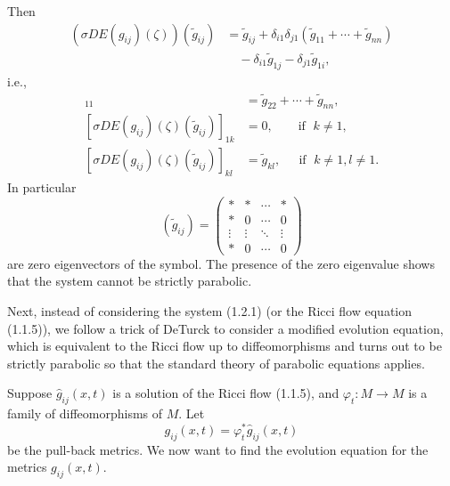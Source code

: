 Then
\begin{align*}
(\sigma DE(g_{ij})(\zeta))(\tilde{g}_{ij}) &  =
\tilde{g}_{ij}+\delta_{i1}\delta_{j1}(\tilde{g}_{11}
+\cdots+\tilde{g}_{nn})\\
&\quad -\delta_{i1}\tilde{g}_{1j}-\delta_{j1}\tilde{g}_{1i},
\end{align*}
i.e.,
\begin{align*}
[\sigma DE(g_{ij})(\zeta)(\tilde{g}_{ij})]_{11}
&  = \tilde{g}_{22}+\cdots+\tilde{g}_{nn} ,\\
[\sigma DE(g_{ij})(\zeta)(\tilde{g}_{ij})]_{1k} &  = 0 ,
\;\;\;\;\;\; \mbox{ if }\; k\neq1,\\
[\sigma DE(g_{ij})(\zeta)(\tilde{g}_{ij})]_{kl} & =
\tilde{g}_{kl}, \;\;\;\;\mbox{ if }\; k\neq1 ,l\neq1.
\end{align*}
In particular
$$
(\tilde{g}_{ij})=\left(
\begin{array}{cccc}\ast&  \ast&  \cdots&  \ast\\
\ast&  0&  \cdots&  0\\
\vdots&  \vdots&  \ddots&  \vdots\\
\ast&  0&  \cdots&  0
\end{array}
\right)
$$
are zero eigenvectors of the symbol. The presence of the zero
eigenvalue shows that the system cannot be strictly parabolic.

Next, instead of considering the system (1.2.1) (or the Ricci flow
equation (1.1.5)), we follow a trick of DeTurck \cite{De} to
consider a modified evolution equation, which is equivalent to the
Ricci flow up to diffeomorphisms and turns out to be strictly
parabolic so that the standard theory of parabolic equations
applies.

Suppose $\hat{g}_{ij}(x,t)$ is a solution of the Ricci flow
(1.1.5), and $\varphi_t: M\rightarrow M$ is a family of
diffeomorphisms of $M$. Let
$$
g_{ij}(x,t)=\varphi^\ast_t\hat{g}_{ij}(x,t)
$$
be the pull-back metrics. We now want to find the evolution
equation for the metrics $g_{ij}(x,t)$.

